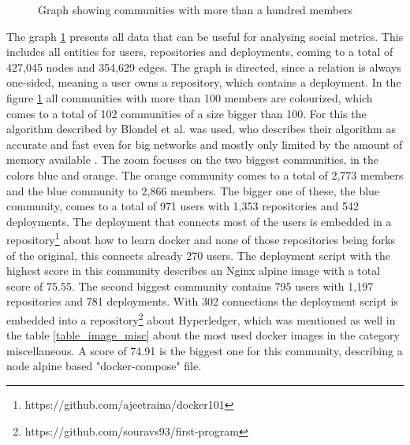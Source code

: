 \begin{figure}[H]\centering
{}
    \caption{Graph showing communities with more than a hundred members}
    \label{fig:graph_communities}
\end{figure}

The graph \ref{fig:graph_communities} presents all data that can be useful for analysing social metrics. This includes all entities for users, repositories and deployments, coming to a total of 427,045 nodes and 354,629 edges. The graph is directed, since a relation is always one-sided, meaning a user owns a repository, which contains a deployment. In the figure \ref{fig:graph_communities} all communities with more than 100 members are colourized, which comes to a total of 102 communities of a size bigger than 100. For this the algorithm described by Blondel et al. was used, who describes their algorithm as accurate and fast even for big networks and mostly only limited by the amount of memory available \cite{Blondel_2008}. The zoom focuses on the two biggest communities, in the colors blue and orange. The orange community comes to a total of 2,773 members and the blue community to 2,866 members. The bigger one of these, the blue community, comes to a total of 971 users with 1,353 repositories and 542 deployments. The deployment that connects most of the users is embedded in a repository\footnote{https://github.com/ajeetraina/docker101} about how to learn docker and none of those repositories being forks of the original, this connects already 270 users. The deployment script with the highest score in this community describes an Nginx alpine image with a total score of 75.55.
The second biggest community contains 795 users with 1,197 repositories and 781 deployments. With 302 connections the deployment script is embedded into a repository\footnote{https://github.com/souravs93/first-program} about Hyperledger, which was mentioned as well in the table \ref{table_image_misc} about the most used docker images in the category miscellaneous. A score of 74.91 is the biggest one for this community, describing a node alpine based "docker-compose" file.

